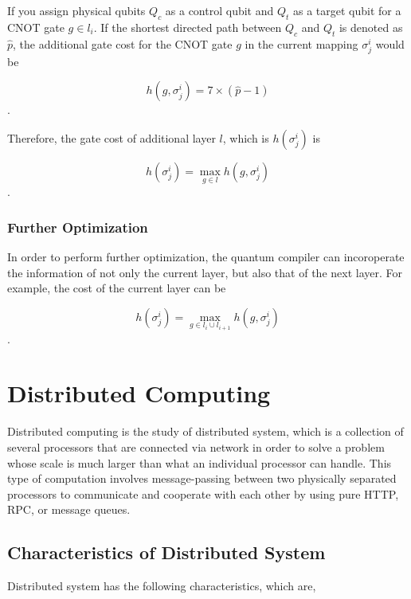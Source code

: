 If you assign physical qubits $Q_c$ as a control qubit and $Q_t$ as a target qubit for a CNOT gate $g \in l_i$.  If the shortest directed path between $Q_c$ and $Q_t$ is denoted as $\hat{p}$, the additional gate cost for the CNOT gate $g$ in the current mapping $\sigma^i_j$ would be 

\begin{equation}
h(g, \sigma^i_j) = 7 \times (\hat{p} - 1)
\end{equation}.

Therefore, the gate cost of additional layer $l$, which is $h(\sigma^i_j)$ is

\begin{equation}
h(\sigma^i_j) = \operatorname{max}_{g \in l} h(g, \sigma^i_j)
\end{equation}.

\subsubsection{Further Optimization}

In order to perform further optimization, the quantum compiler can incoroperate the information of not only the current layer, but also that of the next layer.  For example, the cost of the current layer can be

\begin{equation} 
h(\sigma^i_j) = \operatorname{max}_{g \in l_i \cup l_{i+1}} h(g, \sigma^i_j)
\end{equation}.

\newpage

\section{Distributed Computing}

 Distributed computing is the study of distributed system, which is a collection of several processors that are connected via network in order to solve a problem whose scale is much larger than what an individual processor can handle.  This type of computation involves message-passing between two physically separated processors to communicate and cooperate with each other by using pure HTTP, RPC, or message queues. \cite{distributedcomputingtext} 
 
 \subsection{Characteristics of Distributed System}
 \par Distributed system has the following characteristics, which are,
 
